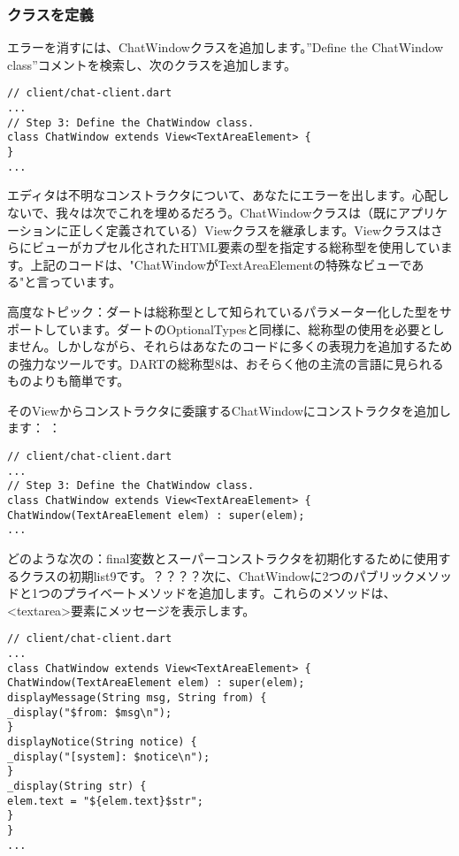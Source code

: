 \subsubsection{クラスを定義}

エラーを消すには、ChatWindowクラスを追加します。”Define the ChatWindow class”コメントを検索し、次のクラスを追加します。

\begin{verbatim}
// client/chat-client.dart
...
// Step 3: Define the ChatWindow class.
class ChatWindow extends View<TextAreaElement> {
}
...
\end{verbatim}

エディタは不明なコンストラクタについて、あなたにエラーを出します。心配しないで、我々は次でこれを埋めるだろう。ChatWindowクラスは（既にアプリケーションに正しく定義されている）Viewクラスを継承します。Viewクラスはさらにビューがカプセル化されたHTML要素の型を指定する総称型を使用しています。上記のコードは、"ChatWindowがTextAreaElementの特殊なビューである"と言っています。

高度なトピック：ダートは総称型として知られているパラメーター化した型をサポートしています。ダートのOptionalTypesと同様に、総称型の使用を必要としません。しかしながら、それらはあなたのコードに多くの表現力を追加するための強力なツールです。DARTの総称型8は、おそらく他の主流の言語に見られるものよりも簡単です。

そのViewからコンストラクタに委譲するChatWindowにコンストラクタを追加します：
：
\begin{verbatim}
// client/chat-client.dart
...
// Step 3: Define the ChatWindow class.
class ChatWindow extends View<TextAreaElement> {
ChatWindow(TextAreaElement elem) : super(elem);
...
\end{verbatim}

どのような次の：final変数とスーパーコンストラクタを初期化するために使用するクラスの初期list9です。？？？？次に、ChatWindowに2つのパブリックメソッドと1つのプライベートメソッドを追加します。これらのメソッドは、<textarea>要素にメッセージを表示します。


\begin{verbatim}
// client/chat-client.dart
...
class ChatWindow extends View<TextAreaElement> {
ChatWindow(TextAreaElement elem) : super(elem);
displayMessage(String msg, String from) {
_display("$from: $msg\n");
}
displayNotice(String notice) {
_display("[system]: $notice\n");
}
_display(String str) {
elem.text = "${elem.text}$str";
}
}
...
\end{verbatim}

